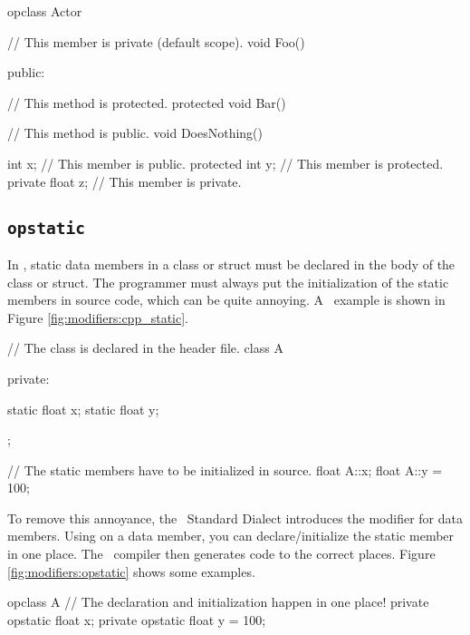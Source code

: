 \begin{opcpp}[label={fig:modifiers:visibility_examples},caption={Using \opCPP\ visibility modifiers.}]
opclass Actor
{
    // This member is private (default scope).
    void Foo()
    {

    }

public:

    // This method is protected.
    protected void Bar()
    {

    }

    // This method is public.
    void DoesNothing()
    {

    }

    int           x; // This member is public.
    protected int y; // This member is protected.
    private float z; // This member is private.
}
\end{opcpp}

\subsection{{\tt opstatic}}
\label{subsec:modifiers:opstatic}

In \cpp, static data members in a class or struct must be declared in the body of the class or struct.  The programmer must always put the initialization of the static members in source code, which can be quite annoying.  A \cpp\ example is shown in Figure \ref{fig:modifiers:cpp_static}. \\

\begin{opcpp}[label={fig:modifiers:cpp_static},caption={Using the \opcppk{static} modifier in \cpp.}]
// The class is declared in the header file.
class A
{
private:

    static float x;
    static float y;
};

// The static members have to be initialized in source.
float A::x;
float A::y = 100;
\end{opcpp}

To remove this annoyance, the \opCPP\ Standard Dialect introduces the  modifier for data members.  Using  on a data member, you can declare/initialize the static member in one place.  The \opCPP\ compiler then generates  code to the correct places.  Figure \ref{fig:modifiers:opstatic} shows some examples.  

\begin{opcpp}[label={fig:modifiers:opstatic},caption={Using the \opcppk{opstatic} data modifier.}]
opclass A
{
    // The declaration and initialization happen in one place!
    private opstatic float x;
    private opstatic float y = 100;
}
\end{opcpp}

